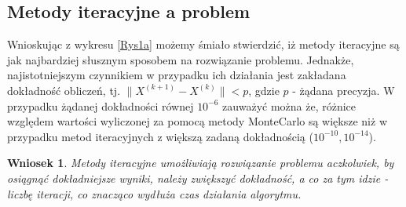 \documentclass[10pt]{article}
\newtheorem{wn}{Wniosek}
\begin{document}
\subsection{Metody iteracyjne a problem}
Wnioskując z wykresu \ref{Rys1a} możemy śmiało stwierdzić, iż metody iteracyjne są jak najbardziej słusznym sposobem na rozwiązanie problemu. Jednakże, najistotniejszym czynnikiem w przypadku ich działania jest zakładana dokładność obliczeń, tj. $\|{X^{(k+1)}-X^{(k)}}\| < p$, gdzie $p$ - żądana precyzja.
W przypadku żądanej dokładności równej $10^{-6}$ zauważyć można że, różnice względem wartości wyliczonej za pomocą metody MonteCarlo są większe niż w przypadku metod iteracyjnych z większą zadaną dokładnością ($10^{-10}, 10^{-14}$).
\begin{wn}
	Metody iteracyjne umożliwiają rozwiązanie problemu aczkolwiek, by osiągnąć dokładniejsze wyniki, należy zwiększyć dokładność, a co za tym idzie - liczbę iteracji, co znacząco wydłuża czas działania algorytmu. \label{wn:1}
\end{wn}
\end{document}
